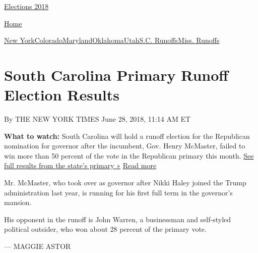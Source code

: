 \href{//www.nytimes3xbfgragh.onion}{}\href{https://www.nytimes3xbfgragh.onion/interactive/2018/us/elections/calendar-primary-results.html}{
Elections 2018}

\href{//www.nytimes3xbfgragh.onion}{ Home}

\href{https://www.nytimes3xbfgragh.onion/interactive/2018/06/26/us/elections/results-new-york-primary-elections.html}{New
York}\href{https://www.nytimes3xbfgragh.onion/interactive/2018/06/26/us/elections/results-colorado-primary-elections.html}{Colorado}\href{https://www.nytimes3xbfgragh.onion/interactive/2018/06/26/us/elections/results-maryland-primary-elections.html}{Maryland}\href{https://www.nytimes3xbfgragh.onion/interactive/2018/06/26/us/elections/results-oklahoma-primary-elections.html}{Oklahoma}\href{https://www.nytimes3xbfgragh.onion/interactive/2018/06/26/us/elections/results-utah-primary-elections-ul.html}{Utah}\href{https://www.nytimes3xbfgragh.onion/interactive/2018/06/26/us/elections/results-south-carolina-primary-runoff-elections.html}{S.C.
Runoffs}\href{https://www.nytimes3xbfgragh.onion/interactive/2018/06/26/us/elections/results-mississippi-primary-runoff-elections.html}{Miss.
Runoffs}

\hypertarget{south-carolina-primary-runoff-election-results}{%
\section{South Carolina Primary Runoff Election
Results}\label{south-carolina-primary-runoff-election-results}}

By THE NEW YORK TIMES June 28, 2018, 11:14 AM ET

\textbf{What to watch:} South Carolina will hold a runoff election for
the Republican nomination for governor after the incumbent, Gov. Henry
McMaster, failed to win more than 50 percent of the vote in the
Republican primary this month.
\href{https://www.nytimes3xbfgragh.onion/interactive/2018/06/12/us/elections/results-south-carolina-primary-elections.html}{See
full results from the state's primary »} \protect\hyperlink{}{Read more}

Mr. McMaster, who took over as governor after Nikki Haley joined the
Trump administration last year, is running for his first full term in
the governor's mansion.

His opponent in the runoff is John Warren, a businessman and self-styled
political outsider, who won about 28 percent of the primary vote.

--- MAGGIE ASTOR

